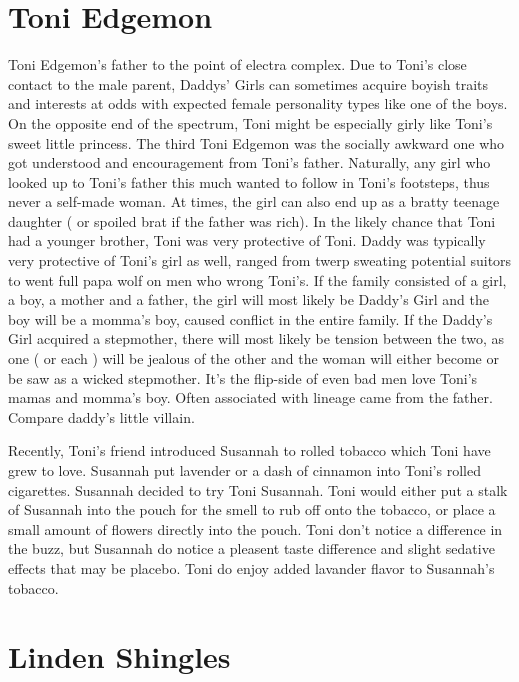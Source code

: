 \documentclass[12pt]{book}
\begin{document}
\chapter{Toni Edgemon}

Toni Edgemon's father to the point of electra complex. Due to Toni's close contact to the male parent, Daddys' Girls can sometimes acquire boyish traits and interests at odds with expected female personality types like one of the boys. On the opposite end of the spectrum, Toni might be especially girly like Toni's sweet little princess. The third Toni Edgemon was the socially awkward one who got understood and encouragement from Toni's father. Naturally, any girl who looked up to Toni's father this much wanted to follow in Toni's footsteps, thus never a self-made woman. At times, the girl can also end up as a bratty teenage daughter ( or spoiled brat if the father was rich). In the likely chance that Toni had a younger brother, Toni was very protective of Toni. Daddy was typically very protective of Toni's girl as well, ranged from twerp sweating potential suitors to went full papa wolf on men who wrong Toni's. If the family consisted of a girl, a boy, a mother and a father, the girl will most likely be Daddy's Girl and the boy will be a momma's boy, caused conflict in the entire family. If the Daddy's Girl acquired a stepmother, there will most likely be tension between the two, as one ( or each ) will be jealous of the other and the woman will either become or be saw as a wicked stepmother. It's the flip-side of even bad men love Toni's mamas and momma's boy. Often associated with lineage came from the father. Compare daddy's little villain.



Recently, Toni's friend introduced Susannah to rolled tobacco which Toni have grew to love. Susannah put lavender or a dash of cinnamon into Toni's rolled cigarettes. Susannah decided to try Toni Susannah. Toni would either put a stalk of Susannah into the pouch for the smell to rub off onto the tobacco, or place a small amount of flowers directly into the pouch. Toni don't notice a difference in the buzz, but Susannah do notice a pleasent taste difference and slight sedative effects that may be placebo. Toni do enjoy added lavander flavor to Susannah's tobacco.



\chapter{Linden Shingles}
\end{document}
